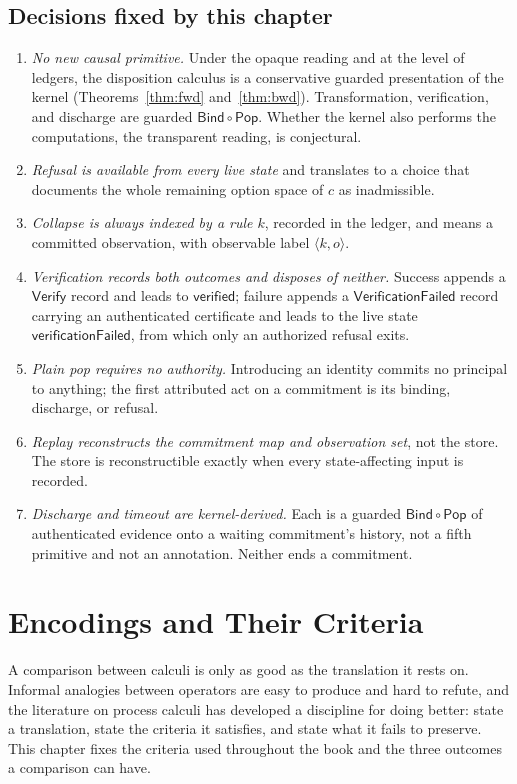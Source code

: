 \documentclass[11pt,openany]{book}
\theoremstyle{remark}
\newcommand{\Pop}{\mathsf{Pop}}
\newcommand{\Bind}{\mathsf{Bind}}
\newcommand{\Verify}{\mathsf{Verify}}
\begin{document}
\section{Decisions fixed by this chapter}

\begin{enumerate}[leftmargin=1.5em]
\item \emph{No new causal primitive.} Under the opaque reading and at the
level of ledgers, the disposition calculus is a conservative guarded
presentation of the kernel (Theorems~\ref{thm:fwd} and~\ref{thm:bwd}).
Transformation, verification, and discharge are guarded $\Bind\circ\Pop$.
Whether the kernel also performs the computations, the transparent
reading, is conjectural.
\item \emph{Refusal is available from every live state} and translates to
a choice that documents the whole remaining option space of $c$ as
inadmissible.
\item \emph{Collapse is always indexed by a rule $k$}, recorded in the
ledger, and means a committed observation, with observable label
$\langle k,o\rangle$.
\item \emph{Verification records both outcomes and disposes of neither.}
Success appends a $\Verify$ record and leads to $\mathsf{verified}$;
failure appends a $\mathsf{VerificationFailed}$ record carrying an
authenticated certificate and leads to the live state
$\mathsf{verificationFailed}$, from which only an authorized refusal
exits.
\item \emph{Plain pop requires no authority.} Introducing an identity
commits no principal to anything; the first attributed act on a
commitment is its binding, discharge, or refusal.
\item \emph{Replay reconstructs the commitment map and observation set},
not the store. The store is reconstructible exactly when every
state-affecting input is recorded.
\item \emph{Discharge and timeout are kernel-derived.} Each is a guarded
$\Bind\circ\Pop$ of authenticated evidence onto a waiting commitment's
history, not a fifth primitive and not an annotation. Neither ends a
commitment.
\end{enumerate}

\chapter{Encodings and Their Criteria}
\label{ch:encodings}

A comparison between calculi is only as good as the translation it rests
on. Informal analogies between operators are easy to produce and hard to
refute, and the literature on process calculi has developed a discipline
for doing better: state a translation, state the criteria it satisfies,
and state what it fails to preserve. This chapter fixes the criteria used
throughout the book and the three outcomes a comparison can have.
\end{document}
